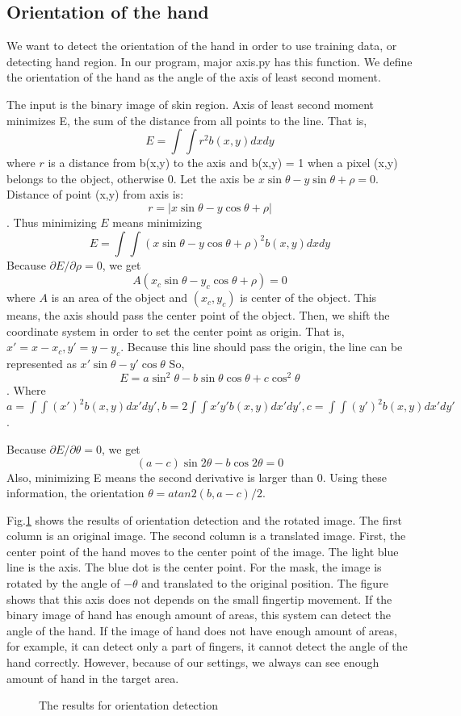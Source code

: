 \subsection{Orientation of the hand}
We want to detect the orientation of the hand in order to use training data, or detecting hand region.
In our program, major axis.py has this function.
We define the orientation of the hand as the angle of the axis of least second moment.\par
The input is the binary image of skin region.
Axis of least second moment minimizes E, the sum of the distance from all points to the line. That is,
$$E = \int \int r^2 b(x,y) dxdy$$
where $r$ is a distance from b(x,y) to the axis and b(x,y) = 1 when a pixel (x,y) belongs to the object, otherwise 0.
Let the axis be $x\sin{\theta} - y\sin{\theta} + \rho = 0$.
Distance of point (x,y) from axis is:
$$r = |x\sin{\theta}-y\cos{\theta}+\rho|$$.
Thus minimizing $E$ means minimizing
$$E = \int\int (x\sin{\theta}-y\cos{\theta}+\rho)^2 b(x,y)dxdy$$
Because $\partial E / \partial \rho = 0$, we get
$$A(x_c \sin{\theta} - y_c \cos{\theta} + \rho) = 0$$
where $A$ is an area of the object and $(x_c,y_c)$ is center of the object.
This means, the axis should pass the center point of the object.
Then, we shift the coordinate system in order to set the center point as origin.
That is, 
$x'= x - x_c, y' = y - y_c$.
Because this line should pass the origin, the line can be represented as
$x'\sin{\theta}-y'\cos{\theta}$
So, $$E = a \sin^2{\theta} - b\sin{\theta}\cos{\theta} + c\cos^2{\theta}$$.
Where $a = \int\int (x')^2 b(x,y) dx'dy', b = 2\int\int x'y' b(x,y) dx'dy', 
c = \int\int (y')^2 b(x,y)dx'dy'$.\par
Because $\partial E / \partial \theta = 0$, we get
$$(a-c)\sin{2\theta} - b\cos{2\theta} = 0$$
Also, minimizing E means the second derivative is larger than 0.
Using these information, the orientation $\theta = atan2(b,a-c)/2$.\par
Fig.\ref{fig:mom2} shows the results of orientation detection and the rotated image.
The first column is an original image.
The second column is a translated image. First, the center point of the hand moves to the center point of the image.
The light blue line is the axis. The blue dot is the center point.
For the mask, the image is rotated by the angle of $-\theta$ and translated to the original position.
The figure shows that this axis does not depends on the small fingertip movement.
If the binary image of hand has enough amount of areas, this system can detect the angle of the hand.
If the image of hand does not have enough amount of areas, for example, it can detect only a part of fingers,
it cannot detect the angle of the hand correctly.
However, because of our settings, we always can see enough amount of hand in the target area.
\begin{figure}
 
 \caption{The results for orientation detection}
 \label{fig:mom2}
\end{figure}
